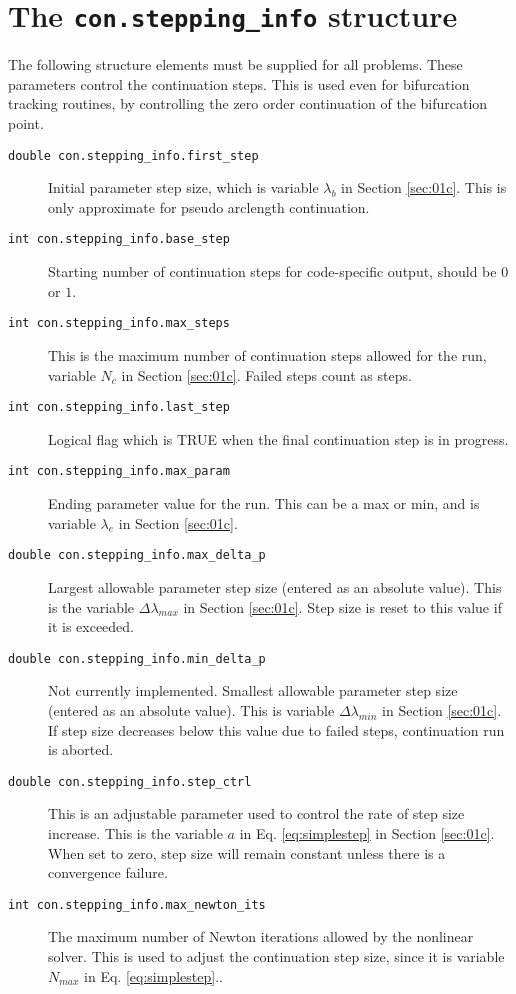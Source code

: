 \section{The \texttt{con.stepping\_info} structure}
\label{sec:csi}

The following structure elements must be supplied for all problems. These parameters control the continuation steps. This is used even for bifurcation tracking routines, by controlling the zero order continuation of the bifurcation point.

\begin{description}
\item[\texttt{double con.stepping\_info.first\_step}] Initial parameter step size, which is variable $\lambda_b$ in Section \ref{sec:01c}. This is only approximate for pseudo arclength continuation.
\item[\texttt{int con.stepping\_info.base\_step}] Starting number of continuation steps for code-specific output, should be $0$ or $1$.
\item[\texttt{int con.stepping\_info.max\_steps}] This is the maximum number of continuation steps allowed for the run, variable $N_c$ in Section \ref{sec:01c}. Failed steps count as steps.
\item[\texttt{int con.stepping\_info.last\_step}] Logical flag which is TRUE when the final continuation step is in progress.
\item[\texttt{int con.stepping\_info.max\_param}] Ending parameter value for the run. This can be a max or min, and is variable $\lambda_e$ in Section \ref{sec:01c}.
\item[\texttt{double con.stepping\_info.max\_delta\_p}] Largest allowable parameter step size (entered as an absolute value). This is the variable $\Delta \lambda_{max}$ in Section \ref{sec:01c}. Step size is reset to this value if it is exceeded.
\item[\texttt{double con.stepping\_info.min\_delta\_p}] Not currently implemented. Smallest allowable parameter step size (entered as an absolute value). This is variable $\Delta \lambda_{min}$ in Section \ref{sec:01c}. If step size decreases below this value due to failed steps, continuation run is aborted.
\item[\texttt{double con.stepping\_info.step\_ctrl}] This is an adjustable parameter used to control the rate of step size increase. This is the variable $a$ in Eq. \ref{eq:simplestep} in Section \ref{sec:01c}. When set to zero, step size will remain constant unless there is a convergence failure.
\item[\texttt{int con.stepping\_info.max\_newton\_its}] The maximum number of Newton iterations allowed by the nonlinear solver. This is used to adjust the continuation step size, since it is variable $N_{max}$ in Eq. \ref{eq:simplestep}..
\end{description}

